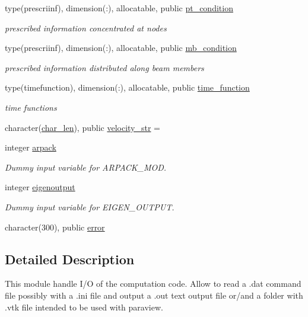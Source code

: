 \begin{DoxyCompactItemize}
type(prescriinf), dimension(\+:), allocatable, public \hyperlink{namespaceioaero_a4344b2018135ae7fe0a09f4265fd2c29}{pt\+\_\+condition}
\begin{DoxyCompactList}\small\item\em prescribed information concentrated at nodes \end{DoxyCompactList}\item 
type(prescriinf), dimension(\+:), allocatable, public \hyperlink{namespaceioaero_a2463929ef049b49fe7b49011c66cc806}{mb\+\_\+condition}
\begin{DoxyCompactList}\small\item\em prescribed information distributed along beam members \end{DoxyCompactList}\item 
type(timefunction), dimension(\+:), allocatable, public \hyperlink{namespaceioaero_accb03392882ddfd413b5ac9ce3be09c6}{time\+\_\+function}
\begin{DoxyCompactList}\small\item\em time functions \end{DoxyCompactList}\item 
character(\hyperlink{namespaceioaero_acd6bdfdcfd986fd1c26261e5996e3b03}{char\+\_\+len}), public \hyperlink{namespaceioaero_ac653c5aea8d1de1b6255d0f47b6722f6}{velocity\+\_\+str} = \textquotesingle{}\textquotesingle{}
\item 
integer \hyperlink{namespaceioaero_a02839259538f3d7e305ebe79cb43d2c4}{arpack}
\begin{DoxyCompactList}\small\item\em Dummy input variable for A\+R\+P\+A\+C\+K\+\_\+\+M\+OD. \end{DoxyCompactList}\item 
integer \hyperlink{namespaceioaero_a8d534ecfa53489b513fc3e339bbfc064}{eigenoutput}
\begin{DoxyCompactList}\small\item\em Dummy input variable for E\+I\+G\+E\+N\+\_\+\+O\+U\+T\+P\+UT. \end{DoxyCompactList}\item 
character(300), public \hyperlink{namespaceioaero_aebd85ae2a176f49a7213d8ed7b68f887}{error}
\end{DoxyCompactItemize}


\subsection{Detailed Description}
This module handle I/O of the computation code. Allow to read a .dat command file possibly with a .ini file and output a .out text output file or/and a folder with .vtk file intended to be used with paraview. 

